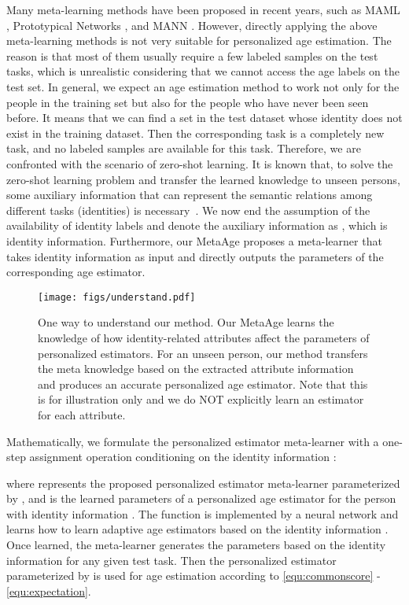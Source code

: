 \documentclass[journal,twoside]{IEEEtran}
\begin{document}
Many meta-learning methods have been proposed in recent years, such as MAML \cite{finn2017model}, Prototypical Networks \cite{snell2017prototypical}, and MANN \cite{santoro2016meta}. However, directly applying the above meta-learning methods is not very suitable for personalized age estimation. The reason is that most of them usually require a few labeled samples on the test tasks, which is unrealistic considering that we cannot access the age labels on the test set. In general, we expect an age estimation method to work not only for the people in the training set but also for the people who have never been seen before. It means that we can find a set  in the test dataset whose identity does not exist in the training dataset. Then the corresponding task  is a completely new task, and no labeled samples are available for this task. Therefore, we are confronted with the scenario of zero-shot learning. It is known that, to solve the zero-shot learning problem and transfer the learned knowledge to unseen persons, some auxiliary information that can represent the semantic relations among different tasks (identities) is necessary~\cite{wang2019survey}. We now end the assumption of the availability of identity labels and denote the auxiliary information as , which is identity information. Furthermore, our MetaAge proposes a meta-learner that takes identity information  as input and directly outputs the parameters of the corresponding age estimator.

\begin{figure*}[t]
  \centering
  \texttt{[image: figs/understand.pdf]}
  \caption{One way to understand our method. Our MetaAge learns the knowledge of  how identity-related attributes affect the parameters of personalized estimators. For an unseen person, our method transfers the meta knowledge based on the extracted attribute information and produces an accurate personalized age estimator. Note that this is for illustration only and we do NOT explicitly learn an estimator for each attribute.}
  \label{fig:understand}
\end{figure*}

Mathematically, we formulate the personalized estimator meta-learner with a one-step assignment operation conditioning on the identity information :

where  represents the proposed personalized estimator meta-learner parameterized by , and  is the learned parameters of a personalized age estimator  for the person with identity information . The function  is implemented by a neural network and learns how to learn adaptive age estimators based on the identity information . Once learned, the meta-learner generates the parameters  based on the identity information for any given test task. Then the personalized estimator parameterized by  is used for age estimation according to \eqref{equ:commonscore} - \eqref{equ:expectation}.
\end{document}
